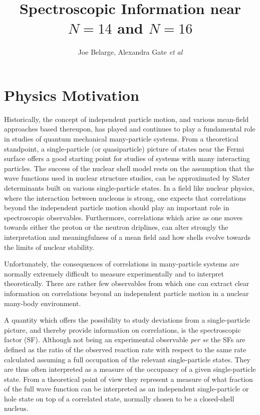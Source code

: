 \documentclass[prc,preprint,superscriptaddress,showpacs,floatfix]{revtex4-1}
\begin{document}
\title{Spectroscopic Information near $N=14$ and $N=16$}

\author{Joe Belarge, Alexandra Gate {\em et al}}

\maketitle


\section{Physics Motivation}
Historically, the concept of independent particle motion, and various
mean-field approaches based thereupon, has played and continues to
play a fundamental role in studies of quantum mechanical many-particle
systems.  From a theoretical standpoint, a single-particle (or
quasiparticle) picture of states near the Fermi surface offers a good
starting point for studies of systems with many interacting particles.
The success of the nuclear shell model rests on the assumption that
the wave functions used in nuclear structure studies, can be
approximated by Slater determinants built on various single-particle
states.  
In a field like nuclear physics, where the interaction between nucleons is strong, one
expects that correlations beyond the independent particle motion
should play an important role in spectroscopic observables.  
Furthermore, correlations which arise as one moves
towards either the proton or the neutron driplines, can alter strongly 
the interpretation and meaningfulness of a mean field and how shells evolve
towards the limits of nuclear stability. 

Unfortunately, the consequences of correlations in many-particle
systems are normally extremely difficult to measure experimentally and
to interpret theoretically. There are rather few observables from
which one can extract clear information on correlations beyond an
independent particle motion in a nuclear many-body environment.

A quantity which offers the possibility to study deviations from a
single-particle picture, and thereby provide information on
correlations, is the spectroscopic factor (SF). Although not being an
experimental observable {\em per se} the SFs are defined as the ratio
of the observed reaction rate with respect to the same rate calculated
assuming a full occupation of the relevant single-particle
states. They are thus often interpreted as a measure of the occupancy
of a given single-particle state. From a theoretical point of view
they represent a measure of what fraction of the full wave function
can be interpreted as an independent single-particle or hole state on
top of a correlated state, normally chosen to be a closed-shell
nucleus.
\end{document}
